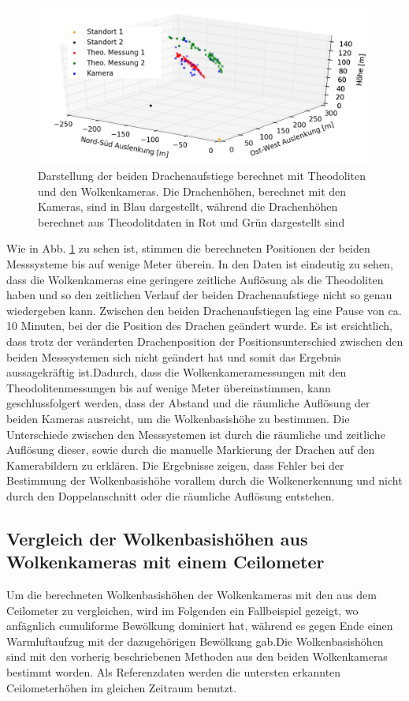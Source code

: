 \documentclass[a4paper,11pt,twoside,german]{article}
\newcommand{\absatz}{\smallbreak}
\begin{document}
\begin{figure}[h]
	\begin{center}
		\includegraphics[width=1\textwidth]{media/dragon_theo.png}
		\caption[Drachenaufstieg]{Darstellung der beiden Drachenaufstiege berechnet mit Theodoliten und den Wolkenkameras.  Die Drachenhöhen, berechnet mit den Kameras, sind in Blau dargestellt, während die Drachenhöhen berechnet aus Theodolitdaten in Rot und Grün dargestellt sind}
		\label{FIGTheoDragon}
	\end{center}
\end{figure}

Wie in Abb. \ref{FIGTheoDragon} zu sehen ist, stimmen die berechneten Positionen
der beiden Messsysteme bis auf wenige Meter überein. In den Daten ist eindeutig
zu sehen, dass die Wolkenkameras eine geringere zeitliche Auflösung als die
Theodoliten haben und so den zeitlichen Verlauf der beiden Drachenaufstiege
nicht so genau wiedergeben kann. Zwischen den beiden Drachenaufstiegen lag eine
Pause von ca. 10 Minuten, bei der die Position des Drachen geändert wurde. Es
ist ersichtlich, dass trotz der veränderten Drachenposition der
Positionsunterschied zwischen den beiden Messsystemen sich nicht geändert hat
und somit das Ergebnis aussagekräftig ist.\absatz Dadurch, dass die
Wolkenkameramessungen mit den Theodolitenmessungen bis auf wenige Meter
übereinstimmen, kann geschlussfolgert werden, dass der Abstand und die räumliche
Auflösung der beiden Kameras ausreicht, um die Wolkenbasishöhe zu bestimmen. Die
Unterschiede zwischen den Messsystemen ist durch die räumliche und zeitliche
Auflösung dieser, sowie durch die manuelle Markierung der Drachen auf den
Kamerabildern zu erklären. Die Ergebnisse zeigen, dass Fehler bei der
Bestimmung der Wolkenbasishöhe vorallem durch die Wolkenerkennung und nicht
durch den Doppelanschnitt oder die räumliche Auflösung entstehen.

\subsection{Vergleich der Wolkenbasishöhen aus Wolkenkameras mit einem
Ceilometer}\label{SECCeilo} 
Um die berechneten Wolkenbasishöhen der Wolkenkameras mit den aus dem Ceilometer
zu vergleichen, wird im Folgenden ein Fallbeispiel gezeigt, wo anfägnlich
cumuliforme Bewölkung dominiert hat, während es gegen Ende einen Warmluftaufzug
mit der dazugehörigen Bewölkung gab.\absatz Die Wolkenbasishöhen sind mit den
vorherig beschriebenen Methoden aus den beiden Wolkenkameras bestimmt worden.
Als Referenzdaten werden die untersten erkannten Ceilometerhöhen im gleichen
Zeitraum benutzt.\absatz
\end{document}
